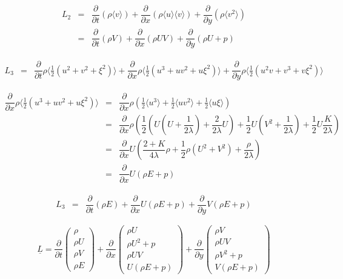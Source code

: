 \documentclass[
	pdftex,             %
	12pt,				%
	a4paper,		   	%
	english,				%
	oneside,			%
]{article}
\newcommand{\mom}[1]{\langle #1 \rangle}
\newcommand{\uu}[1]{\underline{#1}}
\newcommand{\pp}[1]{\dfrac{\partial}{\partial #1}}
\newcommand{\ppt}{\pp{t}}
\newcommand{\ppx}{\pp{x}}
\newcommand{\ppy}{\pp{y}}
\begin{document}
\begin{equation}
\begin{array}{lcl}
L_2 &=& \ppt \left( \rho \mom{v} \right)
      + \ppx \left( \rho \mom{u} \mom{v} \right)
      + \ppy \left( \rho \mom{v^2} \right) \\
    &=& \ppt \left( \rho V \right)
      + \ppx \left( \rho U V \right)
      + \ppy \left( \rho U + p \right)
\end{array}
\end{equation}

\begin{equation}
\begin{array}{lcl}
L_3 &=& \ppt \rho \mom{\frac{1}{2} (u^2 + v^2 + \xi^2)} 
      + \ppx \rho \mom{\frac{1}{2} (u^3 + uv^2 + u\xi^2)}
      + \ppy \rho \mom{\frac{1}{2} (u^2v + v^3 + v\xi^2)}
\end{array}
\end{equation}

\begin{equation}
\begin{array}{lcl}
\ppx \rho \mom{\frac{1}{2} (u^3 + uv^2 + u\xi^2)}
    &=& \ppx \rho \left( \frac{1}{2}\mom{u^3} + \frac{1}{2}\mom{uv^2} + \frac{1}{2}\mom{u\xi} \right)
 \\ &=& \ppx \rho \left( \dfrac{1}{2} \left( U \left( U + \dfrac{1}{2\lambda} \right) + \dfrac{2}{2\lambda}U \right)
                       + \dfrac{1}{2} U \left( V^2 + \dfrac{1}{2\lambda} \right)
                       + \dfrac{1}{2} U \dfrac{K}{2\lambda} \right)
 \\ &=& \ppx U \left( \dfrac{2+K}{4\lambda}\rho + \dfrac{1}{2} \rho \left( U^2 + V^2 \right) + \dfrac{\rho}{2\lambda} \right)
 \\ &=& \ppx U \left( \rho E + p \right)
\end{array}
\end{equation}


\begin{equation}
\begin{array}{lcl}
L_3 &=& \ppt \left( \rho E \right)
      + \ppx U \left( \rho E + p \right)
      + \ppy V \left( \rho E + p \right)
\end{array}
\end{equation}

\begin{equation}
\uu{L}
=
\ppt
\begin{pmatrix}
\rho \\ \rho U \\ \rho V \\ \rho E
\end{pmatrix}
+
\ppx
\begin{pmatrix}
\rho U \\ \rho U^2 + p \\ \rho U V \\ U \left( \rho E + p \right)
\end{pmatrix}
+
\ppy
\begin{pmatrix}
\rho V \\ \rho U V \\ \rho V^2 + p \\ V \left( \rho E + p \right)
\end{pmatrix}
\end{equation}
\end{document}
